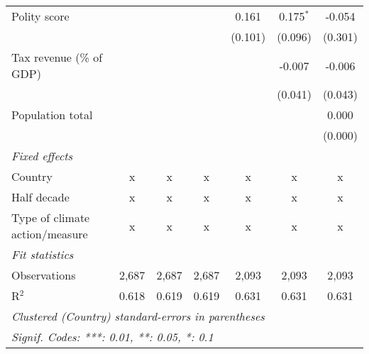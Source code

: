 \begin{tabular}{lcccccc}
   Polity score                                             &              &              &                & 0.161          & 0.175$^{*}$    & -0.054\\   
                                                            &              &              &                & (0.101)        & (0.096)        & (0.301)\\   
   Tax revenue (\% of GDP)                                  &              &              &                &                & -0.007         & -0.006\\   
                                                            &              &              &                &                & (0.041)        & (0.043)\\   
   Population total                                         &              &              &                &                &                & 0.000\\   
                                                            &              &              &                &                &                & (0.000)\\   
   \emph{Fixed effects}\\
   Country                                                  & x            & x            & x              & x              & x              & x\\  
   Half decade                                              & x            & x            & x              & x              & x              & x\\  
   Type of climate action/measure                           & x            & x            & x              & x              & x              & x\\  
   \midrule \emph{Fit statistics}\\
   Observations                                             & 2,687        & 2,687        & 2,687          & 2,093          & 2,093          & 2,093\\  
   R$^2$                                                    & 0.618        & 0.619        & 0.619          & 0.631          & 0.631          & 0.631\\  
   \midrule
   \multicolumn{7}{l}{\emph{Clustered (Country) standard-errors in parentheses}}\\
   \multicolumn{7}{l}{\emph{Signif. Codes: ***: 0.01, **: 0.05, *: 0.1}}\\
\end{tabular}
\par\endgroup


